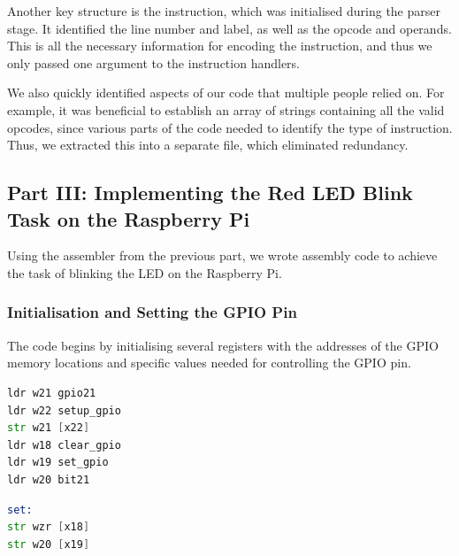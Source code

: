 \documentclass{article}
\begin{document}
Another key structure is the instruction, which was initialised during the parser stage. It identified the line number and label, as well as the opcode and operands. This is all the necessary information for encoding the instruction, and thus we only passed one argument to the instruction handlers.

We also quickly identified aspects of our code that multiple people relied on. For example, it was beneficial to establish an array of strings containing all the valid opcodes, since various parts of the code needed to identify the type of instruction. Thus, we extracted this into a separate file, which eliminated redundancy.


\subsection{Part III: Implementing the Red LED Blink Task on the Raspberry Pi}

Using the assembler from the previous part, we wrote assembly code to achieve the task of blinking the LED on the Raspberry Pi.
\subsubsection{Initialisation and Setting the GPIO Pin}

The code begins by initialising several registers with the addresses of the GPIO memory locations and specific values needed for controlling the GPIO pin.

\begin{minipage}{0.45\textwidth}
\begin{lstlisting}[language=asm, caption=Blink LED Initialisation]
ldr w21 gpio21
ldr w22 setup_gpio
str w21 [x22]
ldr w18 clear_gpio
ldr w19 set_gpio
ldr w20 bit21
\end{lstlisting}
\end{minipage}
\hfill
\begin{minipage}{0.45\textwidth}
\begin{lstlisting}[language=asm, caption=GPIO Pin Set]
set:
str wzr [x18]
str w20 [x19]
\end{lstlisting}
\end{minipage}
\end{document}
